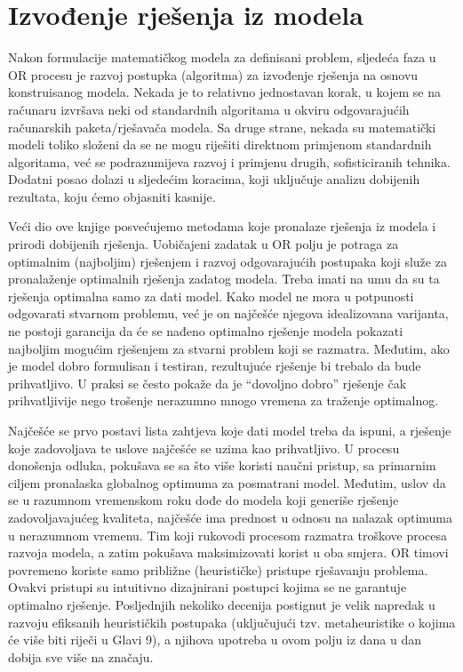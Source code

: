 \documentclass[a4paper, utf8, 11pt, colorlinks]{book}
\begin{document}
\section{Izvođenje rješenja iz modela}

Nakon formulacije matematičkog modela za definisani problem, sljedeća faza u OR procesu je razvoj postupka (algoritma) za
izvođenje rješenja na osnovu konstruisanog modela. Nekada je to relativno jednostavan korak, u kojem se na računaru izvršava neki od standardnih algoritama u okviru odgovarajućih računarskih paketa/rješavača modela. Sa druge strane, nekada su matematički modeli toliko složeni da se ne mogu riješiti direktnom primjenom standardnih algoritama, već se podrazumijeva razvoj i primjenu drugih, sofisticiranih tehnika.
Dodatni posao dolazi u sljedećim koracima, koji uključuje 
analizu dobijenih rezultata, koju ćemo objasniti kasnije. 

Veći dio ove knjige posvećujemo metodama koje pronalaze rješenja iz modela i prirodi dobijenih  rješenja.  Uobičajeni zadatak u OR polju je potraga za optimalnim (najboljim) rješenjem i razvoj odgovarajućih postupaka koji služe za pronala\-ženje optimalnih rješenja zadatog modela. Treba imati na umu da su ta rješenja optimalna samo za dati model. Kako model ne mora u potpunosti odgovarati stvarnom problemu, već je on najčešće njegova idealizovana varijanta, ne postoji garancija da će se nađeno optimalno rješenje modela pokazati najboljim mogućim rješenjem za stvarni problem koji se razmatra. Međutim, ako je
model dobro formulisan i testiran, rezultujuće rješenje  bi trebalo da bude prihvatljivo. U praksi se često pokaže da je ``dovoljno dobro'' rješenje čak prihvatljivije nego trošenje nerazumno mnogo vremena za traženje optimalnog.

Najčešće se prvo postavi lista zahtjeva koje dati model treba da ispuni, a rješenje koje zadovoljava te uslove najčešće se   uzima kao prihvatljivo. U procesu donošenja odluka, pokušava se sa što više  koristi naučni pristup, sa primarnim ciljem pronalaska globalnog optimuma za posmatrani model. Međutim,  uslov da se u razumnom vremenskom roku dođe do modela koji generiše rješenje  zadovoljavajućeg kvaliteta, najčešće ima prednost u odnosu na nalazak optimuma u nerazumnom vremenu. Tim  koji rukovodi procesom  razmatra troškove procesa razvoja modela, a zatim
pokušava maksimizovati korist u oba smjera. OR timovi povremeno koriste samo približne (heurističke) pristupe rješavanju problema. Ovakvi pristupi su intuitivno dizajnirani postupci kojima se ne garantuje optimalno rješenje. Posljednjih nekoliko decenija postignut je velik napredak u razvoju efiksanih heurističkih postupaka (uključujući tzv. metaheuristike o kojima će više biti riječi u Glavi 9), a njihova upotreba u ovom polju iz dana u dan  dobija sve više na značaju.  
\end{document}
